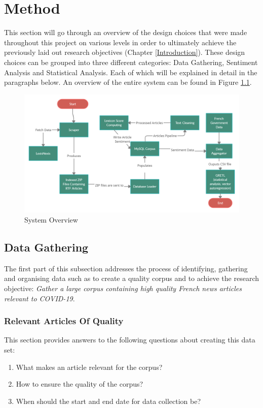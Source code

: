 \chapter{Method}\label{Method}

This section will go through an overview of the design choices that were made throughout this project on various levels in order to ultimately achieve the previously laid out research objectives (Chapter \ref{Introduction}). These design choices can be grouped into three different categories: Data Gathering, Sentiment Analysis and Statistical Analysis. Each of which will be explained in detail in the paragraphs below. An overview of the entire system can be found in Figure \ref{system figure}.


\begin{figure}[h!]
      \centering
      \includegraphics[scale=0.23]{method/system.png}
      \caption{System Overview}
      \label{system figure}
\end{figure}

\section{Data Gathering}

The first part of this subsection addresses the process of identifying, gathering and organising data such as to create a quality corpus and to achieve the research objective: \emph{Gather a large corpus containing high quality French news articles relevant to COVID-19}.

\subsection{Relevant Articles Of Quality}

This section provides answers to the following questions about creating this data set:
\begin{enumerate}
    \item What makes an article relevant for the corpus?
    \item How to ensure the quality of the corpus?
    \item When should the start and end date for data collection be?
\end{enumerate}

